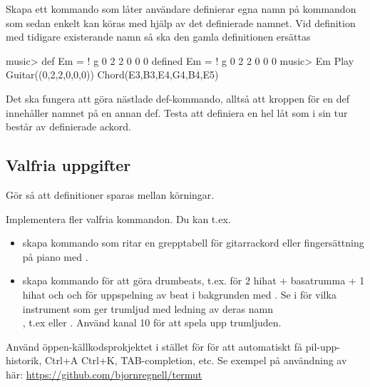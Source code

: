 {%


\Task Skapa ett kommando som låter användare definierar egna namn på kommandon som sedan enkelt kan köras med hjälp av det definierade namnet. Vid definition med tidigare existerande namn så ska den gamla definitionen ersättas
\begin{REPL}
music> def Em = ! g 0 2 2 0 0 0
defined Em = ! g 0 2 2 0 0 0
music> Em
Play Guitar((0,2,2,0,0,0)) Chord(E3,B3,E4,G4,B4,E5)
\end{REPL}
Det ska fungera att göra nästlade def-kommando, alltså att kroppen för en def innehåller namnet på en annan def. Testa att definiera en hel låt som i sin tur består av definierade ackord.

\Task 


\subsection{Valfria uppgifter}

\Task Gör så att definitioner sparas mellan körningar.

\Task Implementera fler valfria kommandon. Du kan t.ex. 
\begin{itemize} 
\item skapa kommando som ritar en grepptabell för gitarrackord eller fingersättning på piano med .
\item skapa kommando för att göra drumbeats, t.ex.  för 2 hihat + basatrumma + 1 hihat och  och  för uppspelning av beat i bakgrunden med . Se i  för vilka instrument som ger trumljud med ledning av deras namn \\, t.ex  eller . Använd kanal 10 för att spela upp trumljuden.
\end{itemize}

\Task Använd öppen-källkodsprokjektet  i stället för  för att automatiskt få pil-upp-historik, Ctrl+A Ctrl+K, TAB-completion, etc. Se exempel på användning av  här: \url{https://github.com/bjornregnell/termut}


}
